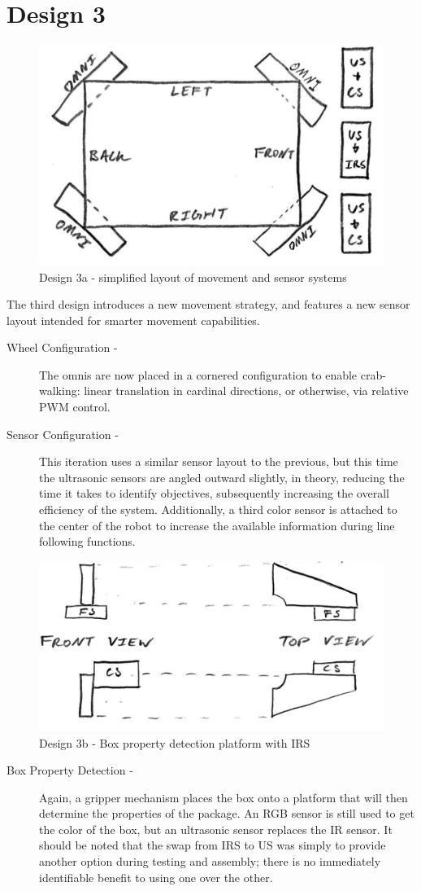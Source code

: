 \documentclass[11pt]{report}
\begin{document}
\section{Design 3}\label{sec:design3}
\begin{figure}[H]
    \centering
    \includegraphics[width=0.5\linewidth]{Images//Designs/Design3a.pdf}
    \caption{Design 3a - simplified layout of movement and sensor systems}
    \label{fig:design3a}
\end{figure}
The third design introduces a new movement strategy, and features a new sensor layout intended for smarter movement capabilities.
\begin{description}
    \item[Wheel Configuration - ]The \glspl{omni} are now placed in a cornered configuration to enable crab-walking: linear translation in cardinal directions, or otherwise, via relative \gls{PWM} control.
    \item[Sensor Configuration - ]This iteration uses a similar sensor layout to the previous, but this time the ultrasonic sensors are angled outward slightly, in theory, reducing the time it takes to identify objectives, subsequently increasing the overall efficiency of the system. Additionally, a third color sensor is attached to the center of the robot to increase the available information during line following functions.
\end{description}
\begin{figure}[H]
    \centering
    \includegraphics[width=0.6\linewidth]{Images//Designs/Design3b.pdf}
    \caption{Design 3b - Box property detection platform with \gls{IRS}}
    \label{fig:design3b}
\end{figure}
\begin{description}
    \item[Box Property Detection - ]Again, a gripper mechanism places the box onto a platform that will then determine the properties of the package. An \gls{RGB} sensor is still used to get the color of the box, but an ultrasonic sensor replaces the \gls{IR} sensor. It should be noted that the swap from \gls{IRS} to \gls{US} was simply to provide another option during testing and assembly; there is no immediately identifiable benefit to using one over the other.
\end{description}
\end{document}
